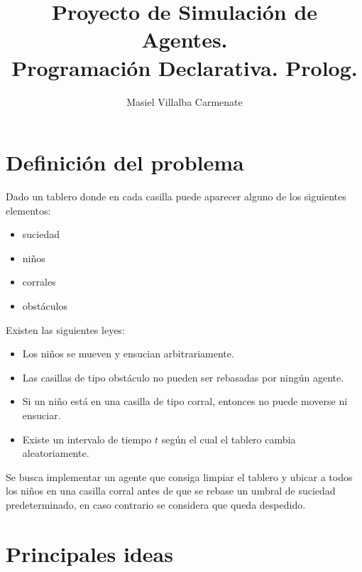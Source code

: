 \documentclass{llncs}
\begin{document}
\title{Proyecto de Simulaci\'on de Agentes.\\ Programaci\'on Declarativa. Prolog.}

\author{
  Masiel Villalba Carmenate 
  }



\maketitle

\section{Definici\'on del problema}

Dado un tablero donde en cada casilla puede aparecer alguno de los siguientes elementos:

\begin{itemize}
\item suciedad
\item ni\~nos
\item corrales
\item obst\'aculos
\end{itemize}

Existen las siguientes leyes:

\begin{itemize}
\item Los ni\~nos se mueven y ensucian arbitrariamente.
\item Las casillas de tipo obst\'aculo no pueden ser rebasadas por ning\'un agente.
\item Si un ni\~no est\'a en una casilla de tipo corral, entonces no puede moverse ni ensuciar.
\item Existe un intervalo de tiempo $t$ seg\'un el cual el tablero cambia aleatoriamente.
\end{itemize}


Se busca implementar un agente que consiga limpiar el tablero y ubicar a todos los ni\~nos en una casilla corral antes de que se rebase un umbral de suciedad predeterminado, en caso contrario se considera que queda despedido.


\section{Principales ideas}
\end{document}
